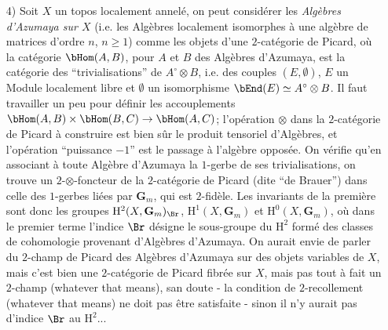 \begin{enumerate}
\item[4)]\label{it:app1.4} Soit $X$ un topos localement annelé, on peut considérer les \emph{Algèbres d'Azumaya sur $X$} (i.e. les Algèbres localement isomorphes à une algèbre de matrices d'ordre $n$, $n \geq 1$) comme les objets d'une $2$-catégorie de Picard, où la catégorie $\bHom(A, B)$, pour $A$ et $B$ des Algèbres d'Azumaya, est la catégorie des ``trivialisations'' de $A^{\circ} \otimes B$, i.e. des couples $(E, \emptyset)$, $E$ un Module localement libre et $\emptyset$ un isomorphisme $\bEnd(E) \simeq A^{\circ}\otimes B$. Il faut travailler un peu pour définir les accouplements $\bHom(A, B) \times \bHom(B, C) \to \bHom(A, C)$; l'opération $\otimes$ dans la $2$-catégorie de Picard à construire est bien sûr le produit tensoriel d'Algèbres, et l'opération ``puissance $-1$'' est le passage à l'algèbre opposée. On vérifie qu'en associant à toute Algèbre d'Azumaya la $1$-gerbe de ses trivialisations, on trouve un $2$-$\otimes$-foncteur de la $2$-catégorie de Picard (dite ``de Brauer'') dans celle des $1$-gerbes liées par $\mathbf{G}_m$, qui est $2$-fidèle. Les invariants de la première sont donc les groupes $\mathrm H^2(X, \mathbf{G}_m)_{\Br}$, $\mathrm H^1(X, \mathbf{G}_m)$ et $\mathrm H^0(X, \mathbf{G}_m)$, où dans le premier terme l'indice $\Br$ désigne le sous-groupe du $\mathrm H^2$ formé des classes de cohomologie provenant d'Algèbres d'Azumaya. On aurait envie de parler du $2$-champ de Picard des Algèbres d'Azumaya sur des objets variables de $X$, mais c'est bien une $2$-catégorie de Picard fibrée sur $X$, mais pas tout à fait un $2$-champ (whatever that means), san doute - la condition de $2$-recollement (whatever that means) ne doit pas être satisfaite - sinon il n'y aurait pas d'indice $\Br$ au $\mathrm H^2$...
\end{enumerate}

